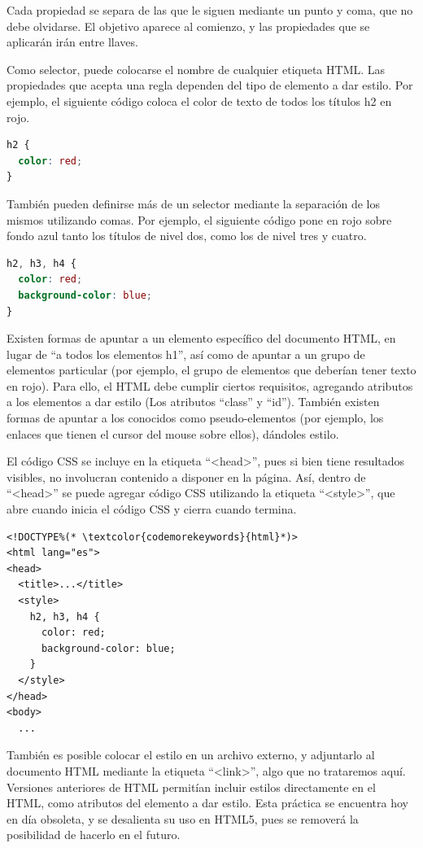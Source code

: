 Cada propiedad se separa de las que le siguen mediante un punto y coma, que no
debe olvidarse. El objetivo aparece al comienzo, y las propiedades que se
aplicarán irán entre llaves.

Como selector, puede colocarse el nombre de cualquier etiqueta HTML. Las
propiedades que acepta una regla dependen del tipo de elemento a dar estilo.
Por ejemplo, el siguiente código coloca el color de texto de todos los títulos
h2 en rojo.

\begin{lstlisting}[language=CSS]
h2 {
  color: red;
}
\end{lstlisting}

También pueden definirse más de un selector mediante la separación de los mismos
utilizando comas. Por ejemplo, el siguiente código pone en rojo sobre fondo
azul tanto los títulos de nivel dos, como los de nivel tres y cuatro.

\begin{lstlisting}[language=CSS]
h2, h3, h4 {
  color: red;
  background-color: blue;
}
\end{lstlisting}

Existen formas de apuntar a un elemento específico del documento HTML, en lugar
de ``a todos los elementos h1'', así como de apuntar a un grupo de elementos
particular (por ejemplo, el grupo de elementos que deberían tener texto en rojo).
Para ello, el HTML debe cumplir ciertos requisitos, agregando atributos a los
elementos a dar estilo (Los atributos ``class'' y ``id''). También existen
formas de apuntar a los conocidos como pseudo-elementos (por ejemplo, los
enlaces que tienen el cursor del mouse sobre ellos), dándoles estilo.

El código CSS se incluye en la etiqueta ``<head>'', pues si bien tiene resultados
visibles, no involucran contenido a disponer en la página. Así, dentro de ``<head>''
se puede agregar código CSS utilizando la etiqueta ``<style>'', que abre cuando
inicia el código CSS y cierra cuando termina.

\begin{lstlisting}[language=XHTML]
<!DOCTYPE%(* \textcolor{codemorekeywords}{html}*)>
<html lang="es">
<head>
  <title>...</title>
  <style>
    h2, h3, h4 {
      color: red;
      background-color: blue;
    }
  </style>
</head>
<body>
  ...
\end{lstlisting}

También es posible colocar el estilo en un archivo externo, y adjuntarlo al
documento HTML mediante la etiqueta ``<link>'', algo que no trataremos aquí.
Versiones anteriores de HTML permitían incluir estilos directamente en el
HTML, como atributos del elemento a dar estilo. Esta práctica se encuentra
hoy en día obsoleta, y se desalienta su uso en HTML5, pues se removerá la
posibilidad de hacerlo en el futuro.


